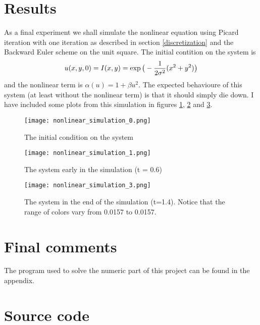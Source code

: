 \documentclass[a4paper,english, 10pt, twoside]{article}
\begin{document}
\section{Results}
As a final experiment we shall simulate the nonlinear equation using Picard iteration with one iteration as described in section 
\ref{discretization} and the Backward Euler scheme on the unit square. The initial contition on the system is
\begin{equation}
 u(x,y,0) = I(x,y)=\exp\big(-{1\over2\sigma^2}(x^2+y^2)\big)
\end{equation}
and the nonlinear term is $\alpha(u) = 1+\beta u^2$. The expected behavioure of this system (at least without the nonlinear term) is that it 
should simply die down. I have included some plots from this simulation in figures \ref{simulation_1}, \ref{simulation_2} and \ref{simulation_3}.
\begin{figure}[H]
\centering
\texttt{[image: nonlinear\_simulation\_0.png]}
\caption{The initial condition on the system}
\label{simulation_1}
\end{figure}
\begin{figure}[H]
\centering
\texttt{[image: nonlinear\_simulation\_1.png]}
\caption{The system early in the simulation (t = 0.6)}
\label{simulation_2}
\end{figure}
\begin{figure}[H]
\centering
\texttt{[image: nonlinear\_simulation\_3.png]}
\caption{The system in the end of the simulation (t=1.4). Notice that the range of colors vary from 0.0157 to 0.0157.}
\label{simulation_3}
\end{figure}
\section{Final comments}
The program used to solve the numeric part of this project can be found in the appendix.
\newpage
\appendix
\section{Source code}

\end{document}
